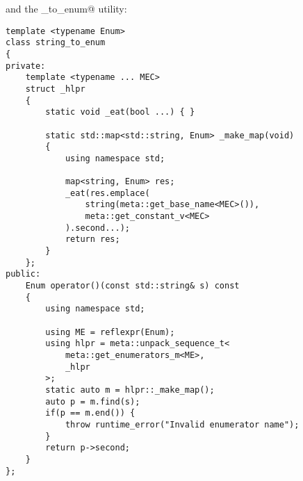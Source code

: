 and the \verb@string_to_enum@ utility:

\begin{verbatim}
template <typename Enum>
class string_to_enum
{
private:
	template <typename ... MEC>
	struct _hlpr
	{
		static void _eat(bool ...) { }

		static std::map<std::string, Enum> _make_map(void)
		{
			using namespace std;

			map<string, Enum> res;
			_eat(res.emplace(
				string(meta::get_base_name<MEC>()),
				meta::get_constant_v<MEC>
			).second...);
			return res;
		}
	};
public:
	Enum operator()(const std::string& s) const
	{
		using namespace std;

		using ME = reflexpr(Enum);
		using hlpr = meta::unpack_sequence_t<
			meta::get_enumerators_m<ME>,
			_hlpr
		>;
		static auto m = hlpr::_make_map();
		auto p = m.find(s);
		if(p == m.end()) {
			throw runtime_error("Invalid enumerator name");
		}
		return p->second;
	}
};
\end{verbatim}

